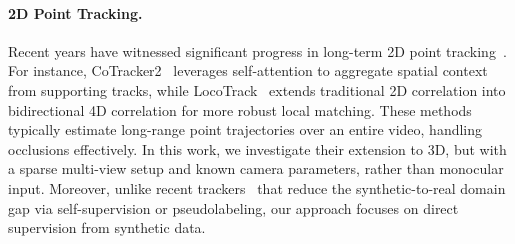 \documentclass[10pt,twocolumn,letterpaper]{article}
\begin{document}
\paragraph{2D Point Tracking.}
Recent years have witnessed significant progress in long-term 2D point tracking~\cite{doersch2023tapvid,harley2022particle,zheng2023point,wang2023omnimotion,doersch2023tapir,karaev2023cotracker,doersch2024bootstap,karaev24cotracker3,cho2024local,harley2025alltracker}. For instance, CoTracker2~\cite{karaev2023cotracker} leverages self-attention to aggregate spatial context from supporting tracks, while LocoTrack~\cite{cho2024local} extends traditional 2D correlation into bidirectional 4D correlation for more robust local matching. These methods typically estimate long-range point trajectories over an entire video, handling occlusions effectively. In this work, we investigate their extension to 3D, but with a sparse multi-view setup and known camera parameters, rather than monocular input. Moreover, unlike recent trackers~\cite{karaev24cotracker3,doersch2024bootstap} that reduce the synthetic-to-real domain gap via self-supervision or pseudolabeling, our approach focuses on direct supervision from synthetic data.
\end{document}
